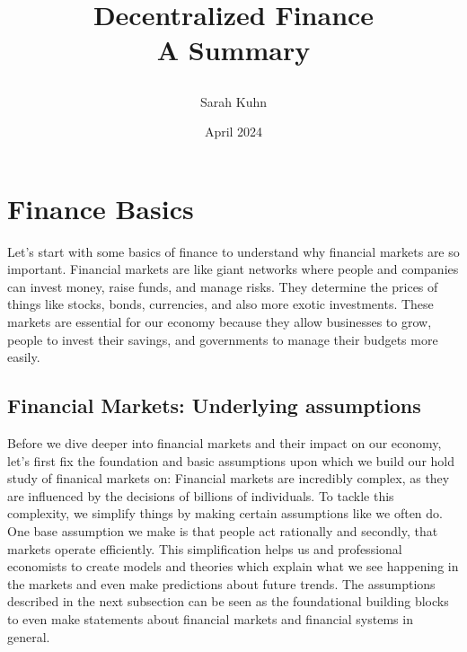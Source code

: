 \documentclass{article}
\title{Decentralized Finance \\
  \large {A Summary}
\author{Sarah Kuhn}
\date{April 2024}
}
\begin{document}
\maketitle
\thispagestyle{empty} %

\newpage
{} %
\setcounter{page}{1} %

\section{Finance Basics}
Let's start with some basics of finance to understand why financial markets are so important. Financial markets are like giant networks where people and companies can invest money, raise funds, and manage risks. They  determine the prices of things like stocks, bonds, currencies, and also more exotic investments. These markets are essential for our economy because they allow  businesses to grow, people to invest their savings, and governments to manage their budgets more easily.

\subsection{Financial Markets: Underlying assumptions} 

Before we dive deeper into financial markets and their impact on our economy, let's first fix the foundation and basic assumptions upon which we build our hold study of finanical markets on:  Financial markets are incredibly complex, as they are influenced by the decisions of billions of individuals. To tackle this complexity, we simplify things by making certain assumptions like we often do. One base assumption we make is that people act rationally and secondly, that markets operate efficiently. This simplification helps us and professional economists to create models and theories which explain what we see happening in the markets and even make predictions about future trends. The assumptions described in the next subsection can be seen as the foundational building blocks to even make statements about financial markets and financial systems in general.
\end{document}
